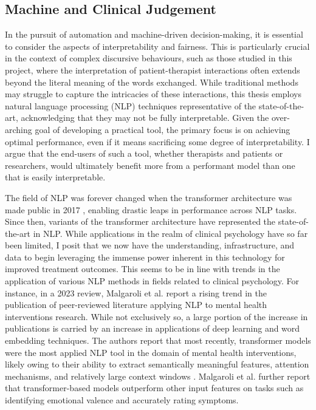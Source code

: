 \documentclass[12pt]{report}
\begin{document}
\subsection*{Machine and Clinical Judgement}
In the pursuit of automation and machine-driven decision-making, it is essential to consider the aspects of interpretability and fairness.
This is particularly crucial in the context of complex discursive behaviours, such as those studied in this project, where the interpretation of patient-therapist interactions often extends beyond the literal meaning of the words exchanged.
While traditional methods may struggle to capture the intricacies of these interactions, this thesis employs natural language processing (NLP) techniques representative of the state-of-the-art, acknowledging that they may not be fully interpretable.
Given the over-arching goal of developing a practical tool, the primary focus is on achieving optimal performance, even if it means sacrificing some degree of interpretability.
I argue that the end-users of such a tool, whether therapists and patients or researchers, would ultimately benefit more from a performant model than one that is easily interpretable.

The field of NLP was forever changed when the transformer architecture was made public in 2017 \cite{Vaswani2017}, enabling drastic leaps in performance across NLP tasks.
Since then, variants of the transformer architecture have represented the state-of-the-art in NLP.
While applications in the realm of clinical psychology have so far been limited, I posit that we now have the understanding, infrastructure, and data to begin leveraging the immense power inherent in this technology for improved treatment outcomes.
This seems to be in line with trends in the application of various NLP methods in fields related to clinical psychology.
For instance, in a 2023 review, Malgaroli et al. \citeyear{Malgaroli2023} report a rising trend in the publication of peer-reviewed literature applying NLP to mental health interventions research.
While not exclusively so, a large portion of the increase in publications is carried by an increase in applications of deep learning and word embedding techniques. The authors report that most recently, transformer models were the most applied NLP tool in the domain of mental health interventions, likely owing to their ability to extract semantically meaningful features, attention mechanisms, and relatively large context windows \cite{Malgaroli2023}.
Malgaroli et al. further report that transformer-based models outperform other input features on tasks such as identifying emotional valence and accurately rating symptoms.
\end{document}

